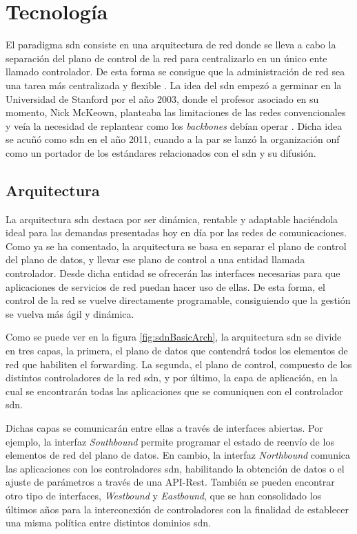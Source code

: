 \section{Tecnología  }

El paradigma \gls{sdn} \cite{nadeau2013sdn} consiste en una arquitectura de red donde se lleva a cabo la separación del plano de control de la red para centralizarlo en un único ente llamado controlador. De esta forma se consigue que la administración de red sea una tarea más centralizada y flexible \cite{nadeau2013sdn}. La idea del \gls{sdn} empezó a germinar en la Universidad de Stanford por el año 2003, donde el profesor asociado en su momento, Nick McKeown, planteaba las limitaciones de las redes convencionales y veía la necesidad de replantear como los \textit{backbones} debían operar \cite{sdnBegins}. Dicha idea se acuñó como \gls{sdn} en el año 2011, cuando a la par se lanzó la organización \gls{onf} \cite{onf} como un portador de los estándares relacionados con el \gls{sdn} y su difusión.

\subsection{Arquitectura}

La arquitectura \gls{sdn} destaca por ser dinámica, rentable y adaptable haciéndola ideal para las demandas presentadas hoy en día por las redes de comunicaciones. Como ya se ha comentado, la arquitectura se basa en separar el plano de control del plano de datos, y llevar ese plano de control a una entidad llamada controlador. Desde dicha entidad se ofrecerán las interfaces necesarias para que aplicaciones de servicios de red puedan hacer uso de ellas. De esta forma, el control de la red se vuelve directamente programable, consiguiendo que la gestión se vuelva más ágil y dinámica.\\
\par

Como se puede ver en la figura \ref{fig:sdnBasicArch}, la arquitectura \gls{sdn} se divide en tres capas, la primera, el plano de datos que contendrá todos los elementos de red que habiliten el forwarding. La segunda, el plano de control, compuesto de los distintos controladores de la red \gls{sdn}, y por último, la capa de aplicación, en la cual se encontrarán todas las aplicaciones que se comuniquen con el controlador \gls{sdn}. \\
\par
Dichas capas se comunicarán entre ellas a través de interfaces abiertas. Por ejemplo, la interfaz \textit{Southbound} permite programar el estado de reenvío de los elementos de red del plano de datos. En cambio, la interfaz \textit{Northbound} comunica las aplicaciones con los controladores \gls{sdn}, habilitando la obtención de datos o el ajuste de parámetros a través de una API-Rest. También se pueden encontrar otro tipo de interfaces, \textit{Westbound} y \textit{Eastbound}, que se han consolidado los últimos años para la interconexión de controladores con la finalidad de establecer una misma política entre distintos dominios \gls{sdn}.


